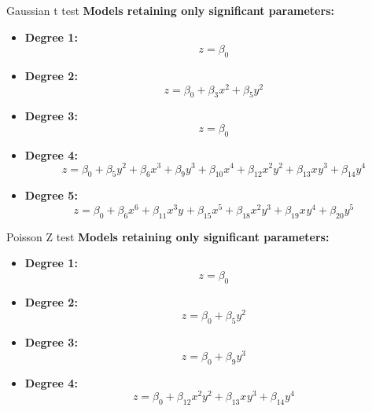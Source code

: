 \documentclass[aspectratio=169]{beamer}
\begin{document}
\begin{frame}{Gaussian t test}
    \small
    \textbf{Models retaining only significant parameters:}
    
    \vspace{0.3cm}
    \begin{itemize}
        \item \textbf{Degree 1:} 
        $$z = \beta_0$$
        
        \vspace{0.15cm}
        \item \textbf{Degree 2:} 
        $$z = \beta_0 + \beta_3 x^2 + \beta_5 y^2$$
        
        \vspace{0.15cm}
        \item \textbf{Degree 3:} 
        $$z = \beta_0$$
        
        \vspace{0.15cm}
        \item \textbf{Degree 4:} 
        $$z = \beta_0 + \beta_5 y^2 + \beta_6 x^3 + \beta_9 y^3 + \beta_{10} x^{4} + \beta_{12} x^{2}  y^{2}+ \beta_{13} x^{}y^{3} + \beta_{14} y^{4}$$
        
        \vspace{0.15cm}
        \item \textbf{Degree 5:} 
        $$z = \beta_0 + \beta_6 x^6 + \beta_{11} x^{3} y^{}+ \beta_{15} x^{5} + \beta_{18} x^{2} y^{3}+ \beta_{19} x^{} y^{4}+ \beta_{20} y^{5}$$
    \end{itemize}
\end{frame}
\begin{frame}{Poisson Z test}
    \small
    \textbf{Models retaining only significant parameters:}
    
    \vspace{0.3cm}
    \begin{itemize}
        \item \textbf{Degree 1:} 
        $$z = \beta_0$$
        
        \vspace{0.2cm}
        \item \textbf{Degree 2:} 
        $$z = \beta_0 + \beta_5 y^2$$
        
        \vspace{0.2cm}
        \item \textbf{Degree 3:} 
        $$z = \beta_0 + \beta_9 y^3$$
        
        \vspace{0.2cm}
        \item \textbf{Degree 4:} 
        $$z = \beta_0 + \beta_{12} x^{2} y^{2}+ \beta_{13} x^{} y^{3}+ \beta_{14} y^{4}$$
    \end{itemize}
    
\end{frame}
\end{document}
